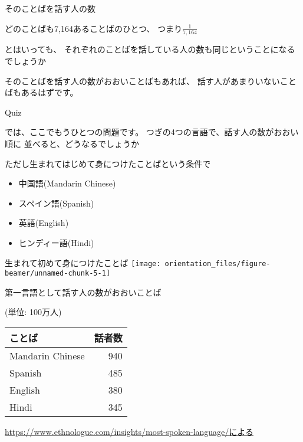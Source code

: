 \documentclass[
  ignorenonframetext,
  aspectratio=169,
  xcolor=dvipsnames]{beamer}
\providecommand{\tightlist}{%
  \setlength{\itemsep}{0pt}\setlength{\parskip}{0pt}}
\begin{document}
\begin{frame}{そのことばを話す人の数}
\label{ux305dux306eux3053ux3068ux3070ux3092ux8a71ux3059ux4ebaux306eux6570}
\Large

どのことばも7,164あることばのひとつ、\pause
つまり\Huge\phantom{0}\(\frac{1}{7,164}\)\phantom{0}

\Large
\pause

とはいっても、
それぞれのことばを話している人の数も同じということになるでしょうか

\pause

そのことばを話す人の数がおおいことばもあれば、
話す人があまりいないことばもあるはずです。
\end{frame}

\begin{frame}{Quiz}
\label{quiz-1}
\Large

では、ここでもうひとつの問題です。
つぎの4つの言語で、話す人の数がおおい順に
並べると、どうなるでしょうか\pause

ただし生まれてはじめて身につけたことばという条件で

\pause

\begin{itemize}[<+->]
\tightlist
\item
  中国語(Mandarin Chinese)
\item
  スペイン語(Spanish)
\item
  英語(English)
\item
  ヒンディー語(Hindi)
\end{itemize}
\end{frame}

\begin{frame}{生まれて初めて身につけたことば}
\label{ux751fux307eux308cux3066ux521dux3081ux3066ux8eabux306bux3064ux3051ux305fux3053ux3068ux3070}
\texttt{[image: orientation\_files/figure-beamer/unnamed-chunk-5-1]}
\end{frame}

\begin{frame}{第一言語として話す人の数がおおいことば}
\label{ux7b2cux4e00ux8a00ux8a9eux3068ux3057ux3066ux8a71ux3059ux4ebaux306eux6570ux304cux304aux304aux3044ux3053ux3068ux3070}
\raggedleft

(単位: 100万人)

\vfill

\Large
\centering

\begin{tabular}{lr}
\toprule
ことば & 話者数\\
\midrule
Mandarin Chinese & 940\\
Spanish & 485\\
English & 380\\
Hindi & 345\\
\bottomrule
\end{tabular}

\vfill

\raggedleft
\scriptsize

\url{https://www.ethnologue.com/insights/most-spoken-language/による}
\end{frame}
\end{document}
